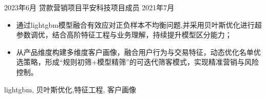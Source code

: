 \begin{experiences}
  \emptySeparator
  \experience
  {2023年6月} {贷款营销项目}{平安科技}{项目成员}
  {2021年7月}    {
				  	\begin{itemize}
				  		\item 通过lightgbm模型融合有效应对正负样本不均衡问题,并采用贝叶斯优化进行超参数调优，结合高阶特征工程与业务理解，持续提升模型区分能力；
				  		\item 从产品维度构建多维度客户画像，融合用户行为与交易特征，动态优化名单优选策略，形成“规则初筛+模型精筛”的可迭代筛客模式，实现精准营销与风险控制。
				  	\end{itemize}
				  }
				  {lightgbm, 贝叶斯优化,特征工程, 客户画像}
		
\end{experiences}
